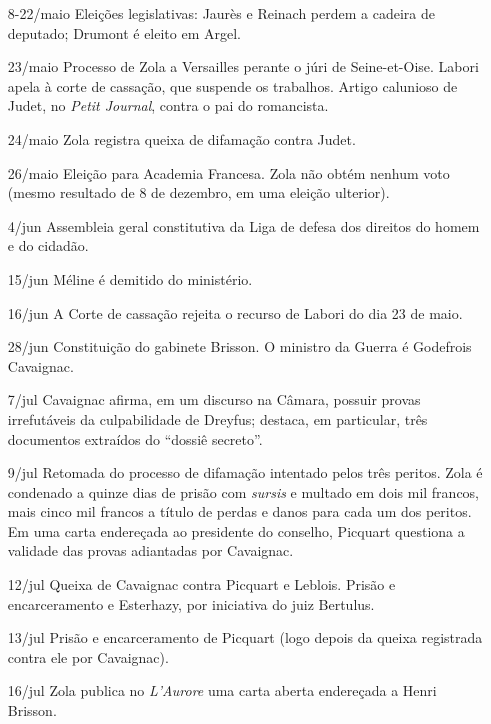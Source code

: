 \begin{itemize}
\item[8-22/maio] Eleições legislativas: Jaurès e Reinach perdem a cadeira de
deputado; Drumont é eleito em Argel. 

\item[23/maio] Processo de Zola a Versailles perante o júri de Seine-et-Oise.
Labori apela à corte de cassação, que suspende os trabalhos. Artigo calunioso
de Judet, no \textit{Petit Journal}, contra o pai do romancista. 

\item[24/maio] Zola registra queixa de difamação contra Judet.  

\item[26/maio] Eleição para Academia Francesa. Zola não obtém nenhum voto
(mesmo resultado de 8 de dezembro, em uma eleição ulterior).  

\item[4/jun] Assembleia geral constitutiva da Liga de defesa dos direitos do
homem e do cidadão. 

\item[15/jun] Méline é demitido do ministério. 

\item[16/jun] A Corte de cassação rejeita o recurso de Labori do dia 23 de
maio.  \item[28/jun]  Constituição do gabinete Brisson. O ministro da Guerra é
Godefrois Cavaignac. 

\item[7/jul] Cavaignac afirma, em um discurso na Câmara, possuir provas
irrefutáveis da culpabilidade de Dreyfus; destaca, em particular, três
documentos extraídos do ``dossiê secreto''.

\item[9/jul] Retomada do processo de difamação intentado pelos três peritos.
Zola é condenado a quinze dias de prisão com \textit{\textit{sursis}} e multado
em dois mil francos, mais cinco mil francos a título de perdas e danos para
cada um dos peritos. Em uma carta endereçada ao presidente do conselho,
Picquart questiona a validade das provas adiantadas por Cavaignac.   

\item[12/jul] Queixa de Cavaignac contra Picquart e Leblois. Prisão e
encarceramento e Esterhazy, por iniciativa do juiz Bertulus.

\item[13/jul] Prisão e encarceramento de Picquart (logo depois da queixa
registrada contra ele por Cavaignac).

\item[16/jul] Zola publica no \textit{L'Aurore} uma carta aberta endereçada a
Henri Brisson.


\end{itemize}
